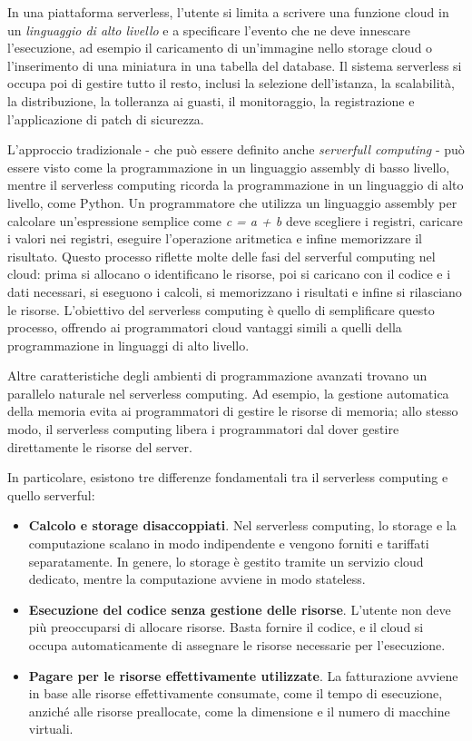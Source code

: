 In una piattaforma serverless, l'utente si limita a scrivere una funzione cloud in un \textit{linguaggio di alto livello} e a specificare l'evento che ne deve innescare l'esecuzione, ad esempio il caricamento di un'immagine nello storage cloud o l'inserimento di una miniatura in una tabella del database. Il sistema serverless si occupa poi di gestire tutto il resto, inclusi la selezione dell'istanza, la scalabilità, la distribuzione, la tolleranza ai guasti, il monitoraggio, la registrazione e l'applicazione di patch di sicurezza. 

L'approccio tradizionale - che può essere definito anche \textit{serverfull computing} - può essere visto come la programmazione in un linguaggio assembly di basso livello, mentre il serverless computing ricorda la programmazione in un linguaggio di alto livello, come Python. Un programmatore che utilizza un linguaggio assembly per calcolare un'espressione semplice come \textit{c = a + b} deve scegliere i registri, caricare i valori nei registri, eseguire l'operazione aritmetica e infine memorizzare il risultato. Questo processo riflette molte delle fasi del serverful computing nel cloud: prima si allocano o identificano le risorse, poi si caricano con il codice e i dati necessari, si eseguono i calcoli, si memorizzano i risultati e infine si rilasciano le risorse. L'obiettivo del serverless computing è quello di semplificare questo processo, offrendo ai programmatori cloud vantaggi simili a quelli della programmazione in linguaggi di alto livello.

Altre caratteristiche degli ambienti di programmazione avanzati trovano un parallelo naturale nel serverless computing. Ad esempio, la gestione automatica della memoria evita ai programmatori di gestire le risorse di memoria; allo stesso modo, il serverless computing libera i programmatori dal dover gestire direttamente le risorse del server.

In particolare, esistono tre differenze fondamentali tra il serverless computing e quello serverful:
\begin{itemize}
    \item \textbf{Calcolo e storage disaccoppiati}. Nel serverless computing, lo storage e la computazione scalano in modo indipendente e vengono forniti e tariffati separatamente. In genere, lo storage è gestito tramite un servizio cloud dedicato, mentre la computazione avviene in modo stateless.
    \item \textbf{Esecuzione del codice senza gestione delle risorse}. L'utente non deve più preoccuparsi di allocare risorse. Basta fornire il codice, e il cloud si occupa automaticamente di assegnare le risorse necessarie per l'esecuzione.
    \item \textbf{Pagare per le risorse effettivamente utilizzate}. La fatturazione avviene in base alle risorse effettivamente consumate, come il tempo di esecuzione, anziché alle risorse preallocate, come la dimensione e il numero di macchine virtuali.
\end{itemize}

